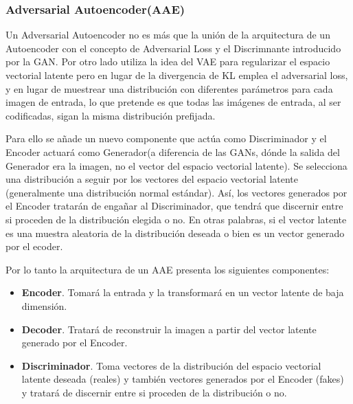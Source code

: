         \subsubsection{Adversarial Autoencoder(AAE)}
            \noindent Un Adversarial Autoencoder no es más que la unión de la arquitectura de un Autoencoder con el concepto de Adversarial Loss y el Discrimnante introducido por la GAN. Por otro lado utiliza la idea del VAE para regularizar el espacio vectorial latente pero en lugar de la divergencia de KL emplea el adversarial loss, y en lugar de muestrear una distribución con diferentes parámetros para cada imagen de entrada, lo que pretende es que todas las imágenes de entrada, al ser codificadas, sigan la misma distribución prefijada.

            \medskip

            \noindent Para ello se añade un nuevo componente que actúa como Discriminador y el Encoder actuará como Generador(a diferencia de las GANs, dónde la salida del Generador era la imagen, no el vector del espacio vectorial latente). Se selecciona una distribución a seguir por los vectores del espacio vectorial latente (generalmente una distribución normal estándar). Así, los vectores generados por el Encoder tratarán de engañar al Discriminador, que tendrá que discernir entre si proceden de la distribución elegida o no. En otras palabras, si el vector latente es una muestra aleatoria de la distribución deseada o bien es un vector generado por el ecoder.

            \medskip

            \noindent Por lo tanto la arquitectura de un AAE presenta los siguientes componentes: 

            \begin{itemize}
                \item \textbf{Encoder}. Tomará la entrada y la transformará en un vector latente de baja dimensión.
                \item \textbf{Decoder}. Tratará de reconstruir la imagen a partir del vector latente generado por el Encoder. 
                \item \textbf{Discriminador}. Toma vectores de la distribución del espacio vectorial latente deseada (reales) y también vectores generados por el Encoder (fakes) y tratará de discernir entre si proceden de la distribución o no.
            \end{itemize}

            \medskip

